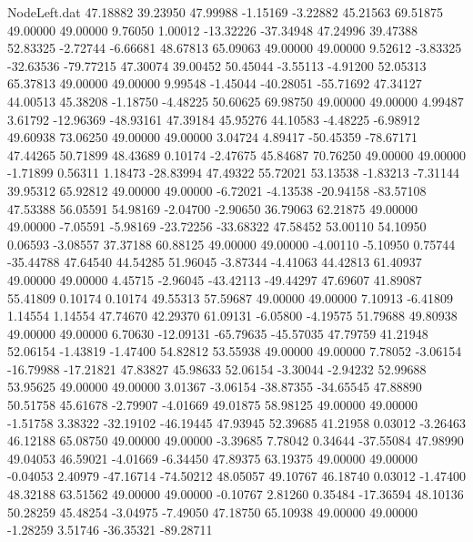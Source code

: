 \begin{filecontents}{NodeLeft.dat}
  47.18882   39.23950   47.99988    -1.15169   -3.22882   45.21563   69.51875   49.00000   49.00000    9.76050    1.00012  -13.32226  -37.34948
  47.24996   39.47388   52.83325    -2.72744   -6.66681   48.67813   65.09063   49.00000   49.00000    9.52612   -3.83325  -32.63536  -79.77215
  47.30074   39.00452   50.45044    -3.55113   -4.91200   52.05313   65.37813   49.00000   49.00000    9.99548   -1.45044  -40.28051  -55.71692
  47.34127   44.00513   45.38208    -1.18750   -4.48225   50.60625   69.98750   49.00000   49.00000    4.99487    3.61792  -12.96369  -48.93161
  47.39184   45.95276   44.10583    -4.48225   -6.98912   49.60938   73.06250   49.00000   49.00000    3.04724    4.89417  -50.45359  -78.67171
  47.44265   50.71899   48.43689     0.10174   -2.47675   45.84687   70.76250   49.00000   49.00000   -1.71899    0.56311    1.18473  -28.83994
  47.49322   55.72021   53.13538    -1.83213   -7.31144   39.95312   65.92812   49.00000   49.00000   -6.72021   -4.13538  -20.94158  -83.57108
  47.53388   56.05591   54.98169    -2.04700   -2.90650   36.79063   62.21875   49.00000   49.00000   -7.05591   -5.98169  -23.72256  -33.68322
  47.58452   53.00110   54.10950     0.06593   -3.08557   37.37188   60.88125   49.00000   49.00000   -4.00110   -5.10950    0.75744  -35.44788
  47.64540   44.54285   51.96045    -3.87344   -4.41063   44.42813   61.40937   49.00000   49.00000    4.45715   -2.96045  -43.42113  -49.44297
  47.69607   41.89087   55.41809     0.10174    0.10174   49.55313   57.59687   49.00000   49.00000    7.10913   -6.41809    1.14554    1.14554
  47.74670   42.29370   61.09131    -6.05800   -4.19575   51.79688   49.80938   49.00000   49.00000    6.70630  -12.09131  -65.79635  -45.57035
  47.79759   41.21948   52.06154    -1.43819   -1.47400   54.82812   53.55938   49.00000   49.00000    7.78052   -3.06154  -16.79988  -17.21821
  47.83827   45.98633   52.06154    -3.30044   -2.94232   52.99688   53.95625   49.00000   49.00000    3.01367   -3.06154  -38.87355  -34.65545
  47.88890   50.51758   45.61678    -2.79907   -4.01669   49.01875   58.98125   49.00000   49.00000   -1.51758    3.38322  -32.19102  -46.19445
  47.93945   52.39685   41.21958     0.03012   -3.26463   46.12188   65.08750   49.00000   49.00000   -3.39685    7.78042    0.34644  -37.55084
  47.98990   49.04053   46.59021    -4.01669   -6.34450   47.89375   63.19375   49.00000   49.00000   -0.04053    2.40979  -47.16714  -74.50212
  48.05057   49.10767   46.18740     0.03012   -1.47400   48.32188   63.51562   49.00000   49.00000   -0.10767    2.81260    0.35484  -17.36594
  48.10136   50.28259   45.48254    -3.04975   -7.49050   47.18750   65.10938   49.00000   49.00000   -1.28259    3.51746  -36.35321  -89.28711

\end{filecontents}
